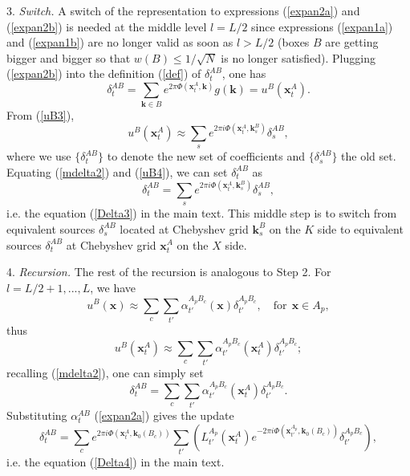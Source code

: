 3. {\it Switch.} A switch of the representation to expressions (\ref{expan2a}) and (\ref{expan2b}) is needed at the middle level $l=L/2$ since expressions (\ref{expan1a}) and (\ref{expan1b}) are no longer valid as soon as $l>L/2$ (boxes $B$ are getting bigger and bigger so that $w(B)\leq 1/\sqrt{N}$ is no longer satisfied). Plugging (\ref{expan2b}) into the definition (\ref{def}) of $\delta_t^{AB}$, one has 
\begin{equation} \label{mdelta2}
\delta_t^{AB}=\sum_{\mathbf{k}\in B}e^{2\pi \Phi(\mathbf{x}_t^A,\mathbf{k})}g(\mathbf{k})=u^B(\mathbf{x}_t^A).
\end{equation}                               
From (\ref{uB3}), 
\begin{equation} \label{uB4}
u^B(\mathbf{x}_t^A)\approx \sum_s e^{2\pi i
  \Phi(\mathbf{x}_t^A,\mathbf{k}_s^B)}\delta_s^{AB},
\end{equation}
where we use $\{\delta_t^{AB}\}$ to denote the new set of coefficients and $\{\delta_s^{AB}\}$ the old set. Equating (\ref{mdelta2}) and (\ref{uB4}), we can set $\delta_t^{AB}$ as
\begin{equation} \label{delta3}
\delta^{AB}_t=
\sum_s e^{2\pi i \Phi(\mathbf{x}_t^A,\mathbf{k}_s^B)}\delta_s^{AB},
\end{equation}
i.e. the equation (\ref{Delta3}) in the main text. This middle step is to switch from equivalent sources $\delta_s^{AB}$ located at Chebyshev grid $\mathbf{k}_s^B$ on the $K$ side to equivalent sources $\delta_t^{AB}$ at Chebyshev grid $\mathbf{x}_t^A$ on the $X$ side.
 
4. {\it Recursion.} The rest of the recursion is analogous to Step 2. For $l=L/2+1,...,L$, we have 
\begin{equation}
u^{B}(\mathbf{x})\approx \sum_c \sum_{t'}
\alpha_{t'}^{A_pB_c}(\mathbf{x})\delta_{t'}^{A_pB_c}, \quad
\text{for} \ \ \mathbf{x}\in A_p,
\end{equation}
thus
\begin{equation} \label{mdelta3}
u^{B}(\mathbf{x}_t^A)\approx \sum_c \sum_{t'}
\alpha_{t'}^{A_pB_c}(\mathbf{x}_t^A)\delta_{t'}^{A_pB_c};
\end{equation}
recalling (\ref{mdelta2}), one can simply set
\begin{equation}
\delta_t^{AB}=\sum_c \sum_{t'}
\alpha_{t'}^{A_pB_c}(\mathbf{x}_t^A)\delta_{t'}^{A_pB_c}.
\end{equation}
Substituting $\alpha_t^{AB}$ (\ref{expan2a}) gives the update
\begin{equation} \label{delta4}
\delta_t^{AB}=\sum_c  e^{2\pi i
  \Phi(\mathbf{x}_t^A,\mathbf{k}_0(B_c))}\sum_{t'} \left( L_{t'}^{A_p}(\mathbf{x}_t^A) e^{-2\pi i
  \Phi(\mathbf{x}_{t'}^{A_p},\mathbf{k}_0(B_c))}\delta_{t'}^{A_pB_c}\right),
\end{equation}
i.e. the equation (\ref{Delta4}) in the main text.

